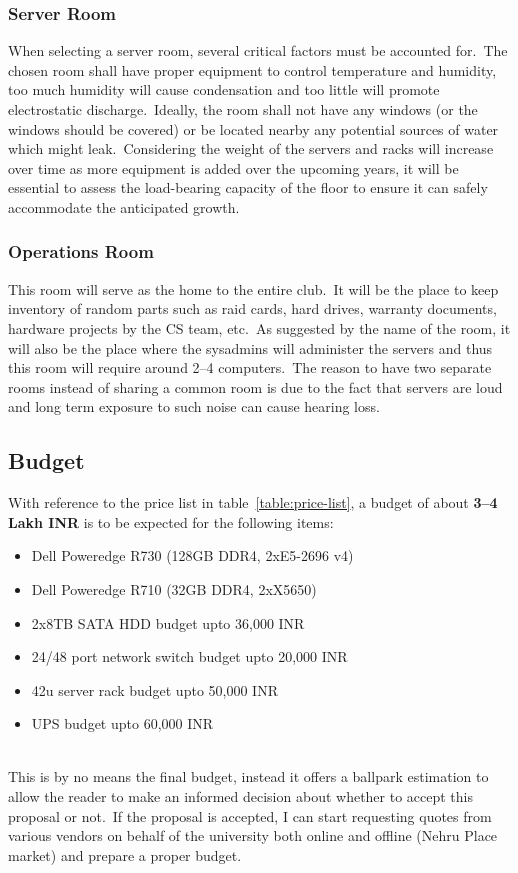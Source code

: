 \subsubsection{Server Room}
When selecting a server room, several critical factors must be accounted for.\ The chosen room shall have proper
equipment to control temperature and humidity, too much humidity will cause condensation and too little will promote
electrostatic discharge.\ Ideally, the room shall not have any windows (or the windows should be covered) or be located
nearby any potential sources of water which might leak.\ Considering the weight of the servers and racks will increase
over time as more equipment is added over the upcoming years, it will be essential to assess the load-bearing capacity
of the floor to ensure it can safely accommodate the anticipated growth.

\subsubsection{Operations Room}
This room will serve as the home to the entire club.\ It will be the place to keep inventory of random parts such as
raid cards, hard drives, warranty documents, hardware projects by the CS team, etc.\ As suggested by the name of the
room, it will also be the place where the sysadmins will administer the servers and thus this room will require around
2--4 computers.\ The reason to have two separate rooms instead of sharing a common room is due to the fact that servers
are loud and long term exposure to such noise can cause hearing loss.


\subsection{Budget}\label{subsec:budget}
With reference to the price list in table~\ref{table:price-list}, a budget of about \textbf{\large3--4 Lakh INR} is
to be expected for the following items:
\begin{itemize}
    \item Dell Poweredge R730 (128GB DDR4, 2xE5-2696 v4)
    \item Dell Poweredge R710 (32GB DDR4, 2xX5650)
    \item 2x8TB SATA HDD budget upto 36,000 INR
    \item 24/48 port network switch budget upto 20,000 INR
    \item 42u server rack budget upto 50,000 INR
    \item UPS budget upto 60,000 INR
\end{itemize}
\\
This is by no means the final budget, instead it offers a ballpark estimation to allow the reader to make an informed
decision about whether to accept this proposal or not.\ If the proposal is accepted, I can start requesting quotes
from various vendors on behalf of the university both online and offline (Nehru Place market) and prepare a proper
budget.